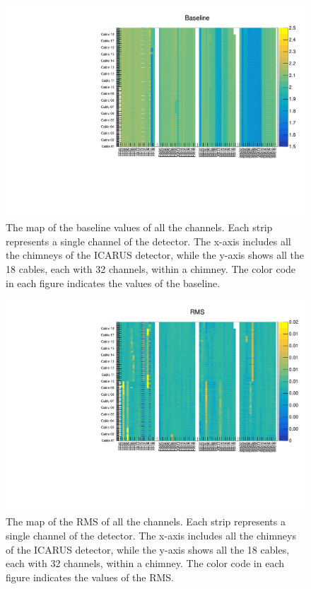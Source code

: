 \begin{figure}
\centering
\includegraphics[width=\textwidth]{fig/Baseline.pdf}
\caption{The map of the baseline values of all the channels.
Each strip represents a single channel of the detector.
The x-axis includes all the chimneys of the ICARUS detector, while
the y-axis shows all the 18 cables, each with 32 channels, within a chimney.
The color code in each figure indicates the values of the baseline.}
\label{fig:baseline}
\end{figure}

\begin{figure}
\centering
\includegraphics[width=\textwidth]{fig/RMS.pdf}
\caption{The map of the RMS of all the channels.
Each strip represents a single channel of the detector.
The x-axis includes all the chimneys of the ICARUS detector, while
the y-axis shows all the 18 cables, each with 32 channels, within a chimney.
The color code in each figure indicates the values of the RMS.}
\label{fig:rms}
\end{figure}

